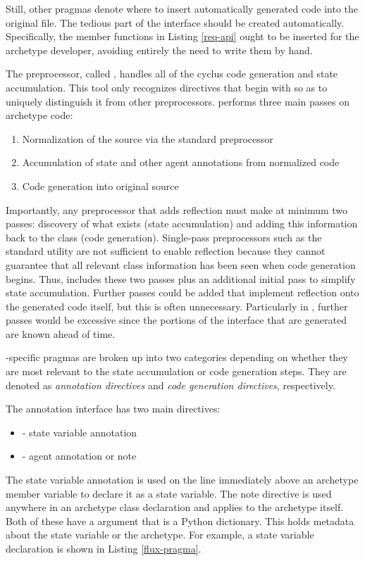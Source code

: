 Still, other pragmas denote where to insert automatically generated code into the 
original file. The tedious 
part of the \cyclus interface should be created automatically. Specifically, 
the member functions in Listing \ref{req-api} ought to be inserted for the
archetype developer, avoiding entirely the need to write them by hand.

The \cyclus preprocessor, called \cycpp, handles all of the cyclus code generation
and state accumulation. This tool only recognizes directives that begin with  so as to uniquely distinguish it from other preprocessors.
\cycpp performs three main passes on archetype code:
\begin{enumerate}
    \item Normalization of the source via the standard preprocessor  
    \item Accumulation of state and other agent annotations from normalized code 
    \item Code generation into original source
\end{enumerate}
Importantly, any preprocessor that adds reflection must make at
minimum two passes: discovery of what exists (state accumulation) and adding this
information back to the class (code generation). Single-pass preprocessors such 
as the standard  utility are not sufficient to enable reflection because they 
cannot guarantee that all relevant class information has been seen when code generation begins. 
Thus, \cycpp includes these two passes plus an additional 
initial pass to simplify state accumulation. Further passes could be added that 
implement reflection onto the generated code itself, but this is often unnecessary. 
Particularly in \cyclus, further passes would be excessive since the portions of the 
 interface that are generated are known ahead of time.

\cyclus-specific pragmas are broken up into two categories depending on whether 
they are most relevant to the state accumulation or code generation steps. They 
are denoted as \emph{annotation directives} and \emph{code generation directives},
respectively.

The \cycpp annotation interface has two main directives:
\begin{itemize}
    \item {} - state variable annotation
    \item {} - agent annotation or note
\end{itemize}
The state variable annotation is used on the line immediately above an archetype
member variable to declare it as a state variable. The note directive is used
anywhere in an archetype class declaration and applies to the archetype itself.
Both of these have a  argument that is a Python dictionary. This 
holds metadata about the state variable or the archetype. For example, a 
state variable declaration is shown in Listing \ref{flux-pragma}.


